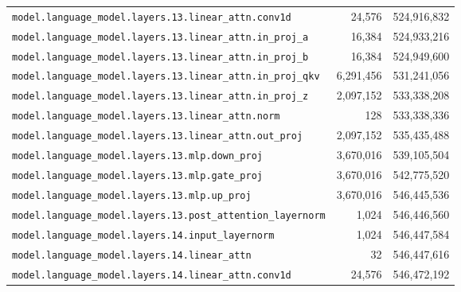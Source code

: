 \documentclass[10pt,a4paper]{article}
\theoremstyle{definition}
\begin{document}
\begin{appendices}
\begin{longtable}{p{9.5cm}rr}
\texttt{model.\allowbreak{}language\_model.\allowbreak{}layers.\allowbreak{}13.\allowbreak{}linear\_attn.\allowbreak{}conv1d} & 24,576 & 524,916,832 \\
\texttt{model.\allowbreak{}language\_model.\allowbreak{}layers.\allowbreak{}13.\allowbreak{}linear\_attn.\allowbreak{}in\_proj\_a} & 16,384 & 524,933,216 \\
\texttt{model.\allowbreak{}language\_model.\allowbreak{}layers.\allowbreak{}13.\allowbreak{}linear\_attn.\allowbreak{}in\_proj\_b} & 16,384 & 524,949,600 \\
\texttt{model.\allowbreak{}language\_model.\allowbreak{}layers.\allowbreak{}13.\allowbreak{}linear\_attn.\allowbreak{}in\_proj\_qkv} & 6,291,456 & 531,241,056 \\
\texttt{model.\allowbreak{}language\_model.\allowbreak{}layers.\allowbreak{}13.\allowbreak{}linear\_attn.\allowbreak{}in\_proj\_z} & 2,097,152 & 533,338,208 \\
\texttt{model.\allowbreak{}language\_model.\allowbreak{}layers.\allowbreak{}13.\allowbreak{}linear\_attn.\allowbreak{}norm} & 128 & 533,338,336 \\
\texttt{model.\allowbreak{}language\_model.\allowbreak{}layers.\allowbreak{}13.\allowbreak{}linear\_attn.\allowbreak{}out\_proj} & 2,097,152 & 535,435,488 \\
\texttt{model.\allowbreak{}language\_model.\allowbreak{}layers.\allowbreak{}13.\allowbreak{}mlp.\allowbreak{}down\_proj} & 3,670,016 & 539,105,504 \\
\texttt{model.\allowbreak{}language\_model.\allowbreak{}layers.\allowbreak{}13.\allowbreak{}mlp.\allowbreak{}gate\_proj} & 3,670,016 & 542,775,520 \\
\texttt{model.\allowbreak{}language\_model.\allowbreak{}layers.\allowbreak{}13.\allowbreak{}mlp.\allowbreak{}up\_proj} & 3,670,016 & 546,445,536 \\
\texttt{model.\allowbreak{}language\_model.\allowbreak{}layers.\allowbreak{}13.\allowbreak{}post\_attention\_layernorm} & 1,024 & 546,446,560 \\
\texttt{model.\allowbreak{}language\_model.\allowbreak{}layers.\allowbreak{}14.\allowbreak{}input\_layernorm} & 1,024 & 546,447,584 \\
\texttt{model.\allowbreak{}language\_model.\allowbreak{}layers.\allowbreak{}14.\allowbreak{}linear\_attn} & 32 & 546,447,616 \\
\texttt{model.\allowbreak{}language\_model.\allowbreak{}layers.\allowbreak{}14.\allowbreak{}linear\_attn.\allowbreak{}conv1d} & 24,576 & 546,472,192 \\

\end{longtable}
\end{appendices}
\end{document}
